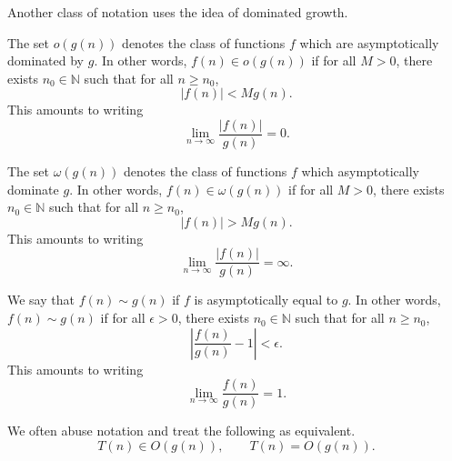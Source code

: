 \documentclass[11pt]{article}
\newcommand{\N}{\mathbb{N}}
\theoremstyle{definition}
\theoremstyle{remark}
\numberwithin{equation}{section}
\begin{document}
    Another class of notation uses the idea of dominated growth.

    \begin{definition}
        The set $o(g(n))$ denotes the class of functions $f$ which are asymptotically
        dominated by $g$. In other words, $f(n) \in o(g(n))$ if for all $M >
        0$, there exists $n_0 \in \N$ such that for all $n \geq n_0$, \[
            |f(n)| < M g(n).
        \] This amounts to writing \[
            \lim_{n \to \infty} \frac{|f(n)|}{g(n)} = 0.
        \] 
    \end{definition}
    
    \begin{definition}
        The set $\omega(g(n))$ denotes the class of functions $f$ which
        asymptotically dominate $g$. In other words, $f(n) \in \omega(g(n))$ if for
        all $M > 0$, there exists $n_0 \in \N$ such that for all $n \geq n_0$, \[
            |f(n)| > M g(n).
        \] This amounts to writing \[
            \lim_{n \to \infty} \frac{|f(n)|}{g(n)} = \infty.
        \] 
    \end{definition}
    
    \begin{definition}
        We say that $f(n) \sim g(n)$ if $f$ is asymptotically equal to $g$.
        In other words, $f(n) \sim g(n)$ if for all $\epsilon > 0$, there exists $n_0
        \in \N$ such that for all $n \geq n_0$, \[
            \left| \frac{f(n)}{g(n)} - 1 \right| < \epsilon.
        \] This amounts to writing \[
            \lim_{n \to \infty} \frac{f(n)}{g(n)} = 1.
        \] 
    \end{definition}

    We often abuse notation and treat the following as equivalent. \[
        T(n) \in O(g(n)), \qquad T(n) = O(g(n)).
    \] 
    
\end{document}
